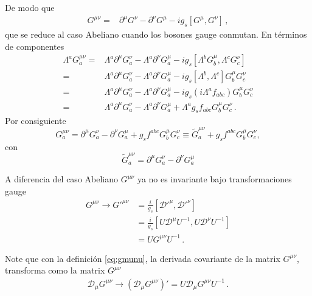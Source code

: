 De modo que
\begin{align}
  {G}^{\mu\nu}=&\partial^\mu G^\nu-\partial^\nu G^\mu-ig_s[G^\mu,G^\nu]\,,
\end{align}
que se reduce al caso Abeliano cuando los bosones gauge conmutan. En términos de componentes
\begin{align}
  \Lambda^a{G}^{\mu\nu}_a=&\Lambda^a\partial^\mu G^\nu_a-\Lambda^a\partial^\nu G^\mu_a-ig_s[\Lambda^bG^\mu_b,\Lambda^cG^\nu_c]\nonumber\\
  =&\Lambda^a\partial^\mu G^\nu_a-\Lambda^a\partial^\nu G^\mu_a-ig_s[\Lambda^b,\Lambda^c]G^\mu_bG^\nu_c\nonumber\\
  =&\Lambda^a\partial^\mu G^\nu_a-\Lambda^a\partial^\nu G^\mu_a-ig_s(i\Lambda^af_{a b c})G^\mu_bG^\nu_c\nonumber\\
  =&\Lambda^a\partial^\mu G^\nu_a-\Lambda^a\partial^\nu G^\mu_a+\Lambda^ag_sf_{a b c}G^\mu_bG^\nu_c\,.
\end{align}
Por consiguiente
\begin{equation}
  \label{eq:258qft}
  G^{\mu\nu}_a=\partial^\mu G^\nu_a-\partial^\nu G^\mu_a+g_s f^{abc}G^\mu_b G^\nu_c\equiv\widetilde{G}^{\mu\nu}_a+g_s f^{abc}G^\mu_b G^\nu_c,
\end{equation}
con
\begin{equation}
  \widetilde{G}^{\mu\nu}_a=\partial^\mu G^\nu_a-\partial^\nu G^\mu_a
\end{equation}



A diferencia del caso Abeliano $G^{\mu\nu}$ ya no es invariante bajo transformaciones gauge
\begin{align}
G^{\mu\nu}\to    {G'}^{\mu\nu}
  &=\frac{i}{g_s}\left[{\mathcal{D}'}^\mu,{\mathcal{D}'}^\nu\right]\nonumber\\
&=\frac{i}{g_s}\left[U{\mathcal{D}}^\mu U^{-1},U{\mathcal{D}}^\nu U^{-1}\right]\nonumber\\
&=U{{G}}^{\mu\nu}U^{-1}\,.
\end{align}

Note que con la definición \eqref{eq:gmunu}, la derivada covariante de la matrix $G^{\mu\nu}$, transforma como la matrix $G^{\mu\nu}$
\begin{align}
\mathcal{D}_\mu G^{\mu\nu} \to\left(\mathcal{D}_\mu G^{\mu\nu}\right)'=U\mathcal{D}_\mu G^{\mu\nu} U^{-1}\,.
\end{align}


